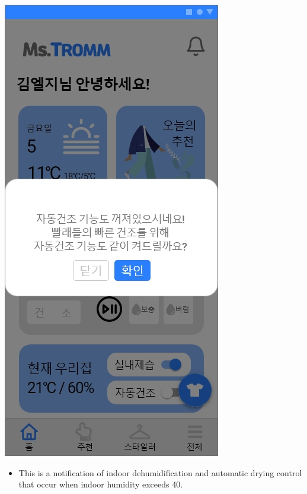 \documentclass[conference]{IEEEtran}
\begin{document}
\begin{enumerate}
{                    \includegraphics[scale=0.24]{assets/제어추천 팝업4.jpg}}
        \begin{itemize}
            \item[] This is a notification of indoor dehumidification and automatic drying control that occur when indoor humidity exceeds 40. \\ \\
        \end{itemize}
    
   \break 
    

\end{enumerate}
\end{document}
